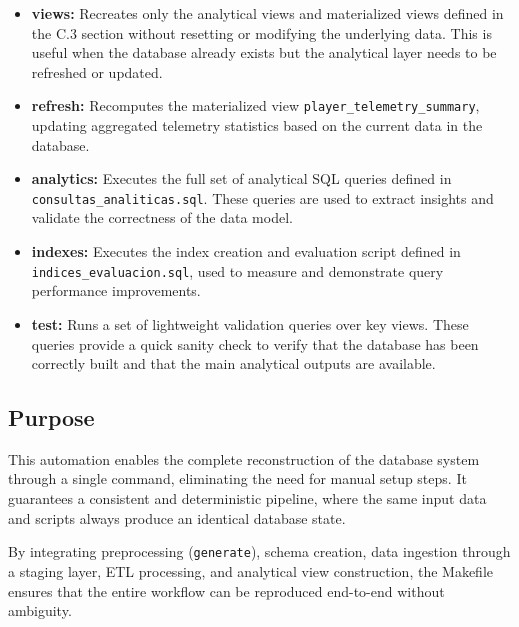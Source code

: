 \documentclass[11pt]{article}
\begin{document}
\begin{itemize}
    This ordering ensures that all dependencies are satisfied before higher-level analytical structures are built.

    \medskip

    \item \textbf{views: }  
    Recreates only the analytical views and materialized views defined in the C.3 section without resetting or modifying the underlying data. This is useful when the database already exists but the analytical layer needs to be refreshed or updated.

    \medskip

    \item \textbf{refresh: }  
    Recomputes the materialized view \texttt{player\_telemetry\_summary}, updating aggregated telemetry statistics based on the current data in the database.

    \medskip

    \item \textbf{analytics: }  
    Executes the full set of analytical SQL queries defined in \texttt{consultas\_analiticas.sql}. These queries are used to extract insights and validate the correctness of the data model.

    \medskip

    \item \textbf{indexes: }  
    Executes the index creation and evaluation script defined in \texttt{indices\_evaluacion.sql}, used to measure and demonstrate query performance improvements.

    \medskip

    \item \textbf{test: }  
    Runs a set of lightweight validation queries over key views. These queries provide a quick sanity check to verify that the database has been correctly built and that the main analytical outputs are available.

\end{itemize}

\subsection{Purpose}

This automation enables the complete reconstruction of the database system through a single command, eliminating the need for manual setup steps. It guarantees a consistent and deterministic pipeline, where the same input data and scripts always produce an identical database state.

By integrating preprocessing (\texttt{generate}), schema creation, data ingestion through a staging layer, ETL processing, and analytical view construction, the Makefile ensures that the entire workflow can be reproduced end-to-end without ambiguity.
\end{document}
